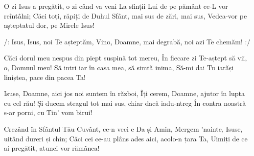 \beginverse
O zi Isus a pregătit, o zi când va veni
La sfinții Lui de pe pământ ce-L vor reîntâlni;
Căci toți, răpiți de Duhul Sfânt, mai sus de zări, mai sus,
Vedea-vor pe așteptatul dor, pe Mirele Isus!
\endverse

\beginchorus
/: Isus, Isus, noi Te așteptăm,
Vino, Doamne, mai degrabă, noi azi Te chemăm! :/
\endchorus

\beginverse
Căci dorul meu nespus din piept suspină tot mereu,
În fiecare zi Te-aștept să vii, o, Domnul meu!
Să intri iar în casa mea, să simtă inima,
Să-mi dai Tu iarăși liniștea, pace din pacea Ta!
\endverse

\beginverse
Isuse, Doamne, aici jos noi suntem în război,
Îți cerem, Doamne, ajutor în lupta cu cel rău!
Și ducem steagul tot mai sus, chiar dacă iadu-ntreg
În contra noastră s-ar porni, cu Tin' vom birui!
\endverse

\beginverse
Crezând în Sfântul Tău Cuvânt, ce-n veci e Da și Amin,
Mergem 'nainte, Isuse, uitând dureri și chin;
Căci cei ce-au plâns ades aici, acolo-n țara Ta,
Uimiți de ce ai pregătit, atunci vor rămânea!
\endverse
\endsong